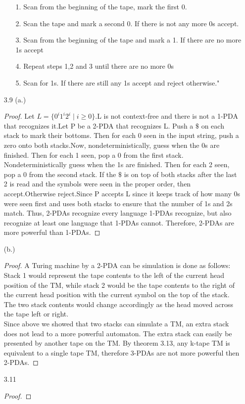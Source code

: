 \documentclass[10pt] {article}
\begin{document}
\begin{enumerate}
\begin{enumerate}
\item[1.]Scan from the beginning of the tape, mark the first 0.
\item[2.]Scan the tape and mark a second 0. If there is not any more 0s accept.
\item[3.]Scan from the beginning of the tape and mark a 1. If there are no more 1s accept 
\item[4.]Repeat steps 1,2 and 3 until there are no more 0s
\item[5.]Scan for 1s. If there are still any 1s accept and reject otherwise."
\end{enumerate}
\item[3.9](a.)\begin{proof}
Let $L=\{ 0^{i}1^{i}2^{i} \mid i\geq 0\}$.L is not context-free and there is not a 1-PDA that recognizes it.Let P be a 2-PDA that recognizes L. Push a $\$$ on each stack to mark their bottoms. Then for each 0 seen in the input string, push a zero onto both stacks.Now, nondeterministically, guess when the 0s are finished. Then for each 1 seen, pop a 0 from the first stack. Nondeterministically guess when the 1s are finished. Then for each 2 seen, pop a 0 from the second stack. If the $\$$ is on top of both stacks after the last 2 is read and the symbols were seen in the proper order, then accept.Otherwise reject.Since P accepts L since it keeps track of how many 0s were seen first and uses both stacks to ensure that the number of 1s and 2s match. Thus, 2-PDAs recognize every language 1-PDAs recognize, but also recognize at least one language that 1-PDAs
cannot. Therefore, 2-PDAs are more powerful than 1-PDAs.
\end{proof}
(b.)\begin{proof}
A Turing machine by a 2-PDA can be simulation is done as follows:\\
Stack 1 would represent the tape contents to the left of the current head position of the TM, while stack 2 would be the tape contents to the right of the current head position with the current symbol on the top of the stack. The two stack contents would change accordingly as the head moved across the tape left or right.\\
Since above we showed that two stacks can simulate a TM, an extra stack does not lead to a more powerful automaton. The extra stack can easily be presented by another tape on the TM. By theorem 3.13, any k-tape TM is equivalent to a single tape TM, therefore 3-PDAs are not more powerful then 2-PDAs.
\end{proof}
\item[3.11]\begin{proof}

\end{proof}
\end{enumerate}
\end{document}
